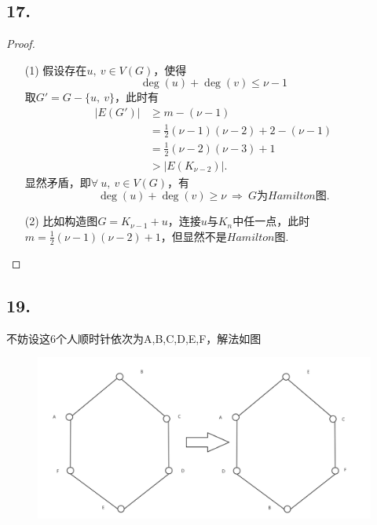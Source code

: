 \documentclass{article}
\begin{document}
\subsection*{17.}
\begin{proof}
    \begin{enumerate}
        \item []
        \item [(1)]假设存在$u,\ v\in V(G)$，使得
        \[
            \deg (u) +\deg (v) \leq \nu-1
        \]
        取$G'=G-\{u,\ v\}$，此时有
        \begin{align*}
            |E(G')|&\geq m-(\nu-1)\\
            &=\displaystyle{\frac{1}{2}}(\nu -1)(\nu -2)+2 -(\nu -1)\\
            &=\displaystyle{\frac{1}{2}}(\nu -2)(\nu -3)+1\\
            &> |E(K_{\nu -2})|.
        \end{align*}
        显然矛盾，即$\forall\ u,\ v\in V(G)$，有
        \[
            \deg (u)+\deg (v)\geq \nu
            \ \Rightarrow
            \ G\mbox{为}Hamilton\mbox{图}.
        \]
        \item [(2)]比如构造图$G=K_{\nu -1} + u$，连接$u$与$K_n$中任一点，此时$m=\displaystyle{\frac{1}{2}}(\nu -1)(\nu -2)+1$，但显然不是$Hamilton$图.
    \end{enumerate}
\end{proof}
\clearpage
\subsection*{19.}不妨设这6个人顺时针依次为A,B,C,D,E,F，解法如图
\begin{figure}[htbp]
    \centering
    \includegraphics[scale=0.25]{t19.png}
\end{figure}
\end{document}
